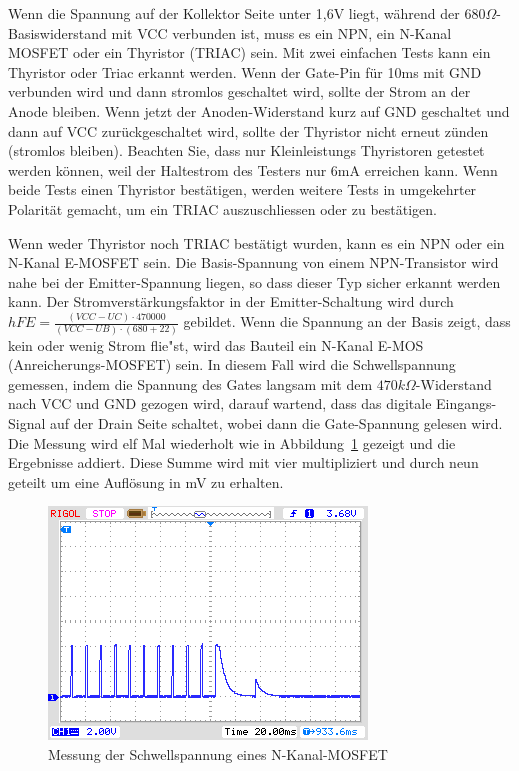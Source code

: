 Wenn die Spannung auf der Kollektor Seite unter 1,6V liegt, während der \(680\Omega\)-Basiswiderstand mit
VCC verbunden ist, muss es ein NPN, ein N-Kanal MOSFET oder ein Thyristor (TRIAC) sein.
Mit zwei einfachen Tests kann ein Thyristor oder Triac erkannt werden.
Wenn der Gate-Pin f\"ur 10ms mit GND verbunden wird und dann stromlos geschaltet wird, sollte
der Strom an der Anode bleiben.
Wenn jetzt der Anoden-Widerstand kurz auf GND geschaltet und dann auf VCC zur\"uckgeschaltet wird,
sollte der Thyristor nicht erneut z\"unden (stromlos bleiben).
Beachten Sie, dass nur Kleinleistungs Thyristoren getestet werden k\"onnen, weil der Haltestrom des
Testers nur 6mA erreichen kann.
Wenn beide Tests einen Thyristor best\"atigen, werden weitere Tests in umgekehrter Polarit\"at gemacht,
um ein TRIAC auszuschliessen oder zu best\"atigen.

Wenn weder Thyristor noch TRIAC best\"atigt wurden, kann es ein NPN oder ein N-Kanal E-MOSFET sein.
Die Basis-Spannung von einem NPN-Transistor wird nahe bei der Emitter-Spannung liegen, so dass dieser Typ sicher
erkannt werden kann.
Der Stromverst\"arkungsfaktor in der Emitter-Schaltung wird durch \(hFE = \frac{(VCC-UC)\cdot 470000}{(VCC-UB)\cdot (680+22)}\) 
gebildet.
Wenn die Spannung an der Basis zeigt, dass kein oder wenig Strom flie"st, wird das Bauteil ein N-Kanal E-MOS
(Anreicherungs-MOSFET) sein. In diesem Fall wird die Schwellspannung gemessen, indem die Spannung des Gates langsam mit
dem \(470k\Omega\)-Widerstand nach VCC und GND gezogen wird, darauf wartend, dass das digitale
Eingangs-Signal auf der Drain Seite schaltet, wobei dann die Gate-Spannung gelesen wird.
Die Messung wird elf Mal wiederholt wie in Abbildung~\ref{fig:eleven} gezeigt und die Ergebnisse addiert.
Diese Summe wird mit vier multipliziert und durch neun geteilt um eine Aufl\"osung in mV zu erhalten.
\begin{figure}[H]
\centering
\includegraphics[]{../PNG/IRFU120gate.png}
\caption{Messung der Schwellspannung eines N-Kanal-MOSFET}
\label{fig:eleven}
\end{figure}

